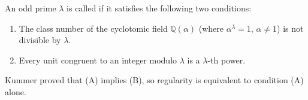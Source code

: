 An odd prime $\lambda$ is called  if it satisfies the following two conditions:
\begin{enumerate}
\item[(A)] The class number of the cyclotomic field $\mathbb{Q}(\alpha)$ (where $\alpha^\lambda = 1$, $\alpha \neq 1$) is not divisible by $\lambda$.
\item[(B)] Every unit congruent to an integer modulo $\lambda$ is a $\lambda$-th power.
\end{enumerate}
Kummer proved that (A) implies (B), so regularity is equivalent to condition (A) alone.
